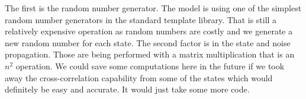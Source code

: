 The first is the random number generator.  The model is using 
one of the simplest random number generators in the standard template library.  
That is still a relatively expensive operation as random numbers are costly and 
we generate a new random number for each state.  The second factor is in the 
state and noise propagation.  Those are being performed with a matrix 
multiplication that is an $n^2$ operation.  We could save some computations 
here in the future if we took away the cross-correlation capability from some 
of the states which would definitely be easy and accurate.  It would just take 
some more code.


